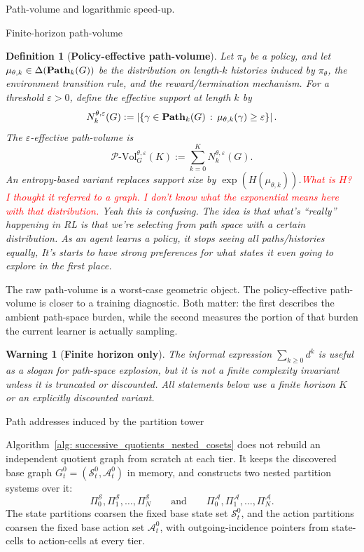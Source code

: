 \documentclass[11pt]{article}
\newtheorem{definition}[subsubsection]{Definition}
\newtheorem{warning}[subsubsection]{Warning}
\newcommand{\PVol}{\mathcal{P}\text{-}\mathrm{Vol}}
\begin{document}
\begin{section}{Path-volume and logarithmic speed-up.}
\begin{subsection}{Finite-horizon path-volume}
\begin{definition}[{\bf Policy-effective path-volume}]\label{def:policy-effective-path-volume}
\normalfont
Let $\pi_\theta$ be a policy, and let
$
\mu_{\theta,k}\in \Delta(\bold{Path}_k(G))
$
be the distribution on length-$k$ histories induced by $\pi_\theta$, the environment transition rule, and the reward/termination mechanism. For a threshold $\varepsilon>0$, define the effective support at length $k$ by
$$
N_k^{\theta,\varepsilon}(G)
:=
\left|
\left\{
\gamma\in\bold{Path}_k(G)
\,:\,
\mu_{\theta,k}(\gamma)\ge\varepsilon
\right\}
\right|.
$$
The $\varepsilon$-effective path-volume is
$$
\PVol_G^{\theta,\varepsilon}(K)
:=
\sum_{k=0}^{K}N_k^{\theta,\varepsilon}(G).
$$
An entropy-based variant replaces support size by $\exp(H(\mu_{\theta,k}))$.\textcolor{red}{What is $H$? I thought it referred to a graph. I don't know what the exponential means here with that distribution.} {\color{blue} Yeah this is confusing. The idea is that what's ``really'' happening in RL is that we're selecting from path space with a certain distribution. As an agent learns a policy, it stops seeing all paths/histories equally, It's starts to have strong preferences for what states it even going to explore in the first place. }
\end{definition}

The raw path-volume is a worst-case geometric object. The policy-effective path-volume is closer to a training diagnostic. Both matter: the first describes the ambient path-space burden, while the second measures the portion of that burden the current learner is actually sampling.

\begin{warning}[{\bf Finite horizon only}]
\normalfont
The informal expression
$
\sum_{k\ge0}d^k
$
is useful as a slogan for path-space explosion, but it is not a finite complexity invariant unless it is truncated or discounted. All statements below use a finite horizon $K$ or an explicitly discounted variant.
\end{warning}

\end{subsection}

\begin{subsection}{Path addresses induced by the partition tower}

Algorithm~\ref{alg: successive_quotients_nested_cosets} does not rebuild an independent quotient graph from scratch at each tier. It keeps the discovered base graph
$
G_t^0=(\mathcal{S}_t^0,\mathcal{A}_t^0)
$
in memory, and constructs two nested partition systems over it:
$$
\Pi_0^{\mathcal S},\Pi_1^{\mathcal S},\ldots,\Pi_N^{\mathcal S}
\qquad\text{and}\qquad
\Pi_0^{\mathcal A},\Pi_1^{\mathcal A},\ldots,\Pi_N^{\mathcal A}.
$$
The state partitions coarsen the fixed base state set $\mathcal{S}_t^0$, and the action partitions coarsen the fixed base action set $\mathcal{A}_t^0$, with outgoing-incidence pointers from state-cells to action-cells at every tier.


\end{subsection}
\end{section}
\end{document}
